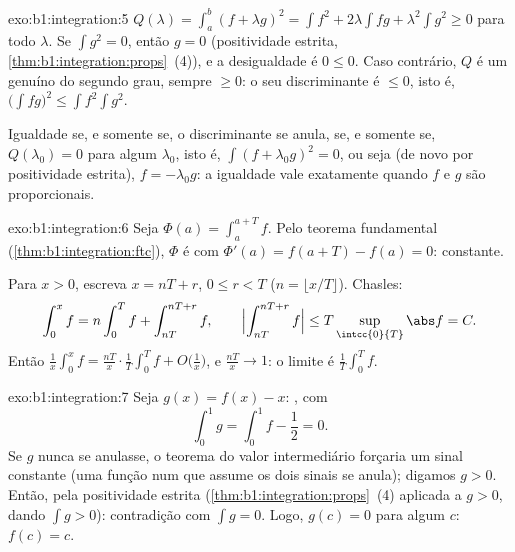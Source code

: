 \begin{solution}{exo:b1:integration:5}
$Q(\lambda) = \int_a^b (f + \lambda g)^2 = \int f^2 + 2\lambda \int
fg + \lambda^2 \int g^2 \geq 0$ para todo $\lambda$. Se $\int g^2 =
0$, então $g = 0$ (positividade estrita,
\cref{thm:b1:integration:props}~(4)), e a desigualdade é $0 \leq
0$. Caso contrário, $Q$ é um genuíno  do segundo grau,
sempre $\geq 0$: o seu discriminante é $\leq 0$, isto é, $\bigl(\int fg\bigr)^2 \leq \int
f^2 \int g^2$.

Igualdade se, e somente se, o discriminante se anula, se, e somente se,
$Q(\lambda_0) = 0$ para algum $\lambda_0$, isto é, $\int (f + \lambda_0 g)^2 = 0$, ou seja (de novo por positividade
estrita), $f = -\lambda_0 g$: a igualdade vale exatamente quando
$f$ e $g$ são proporcionais.
\end{solution}

\begin{solution}{exo:b1:integration:6}
Seja $\Phi(a) = \int_a^{a+T} f$. Pelo teorema fundamental
(\cref{thm:b1:integration:ftc}), $\Phi$ é  com
$\Phi'(a) = f(a + T) - f(a) = 0$: constante.

Para $x > 0$, escreva $x = nT + r$, $0 \leq r < T$ ($n = \lfloor x/T
\rfloor$). Chasles:
\[
\int_0^x f = n \int_0^T f + \int_{nT}^{nT + r} f,
\qquad
\Bigl| \int_{nT}^{nT+r} f \Bigr| \leq T \sup_{\intcc{0}{T}} \abs f
= C .
\]
Então $\frac 1x \int_0^x f = \frac{nT}{x}\cdot\frac 1T \int_0^T f +
O\bigl(\frac 1x\bigr)$, e $\frac{nT}{x} \to 1$: o limite é
$\frac1T \int_0^T f$.
\end{solution}

\begin{solution}{exo:b1:integration:7}
Seja $g(x) = f(x) - x$: , com
\[
\int_0^1 g = \int_0^1 f - \frac12 = 0 .
\]
Se $g$ nunca se anulasse, o teorema do valor intermediário forçaria um
sinal constante (uma função  num  que assume os dois
sinais se anula); digamos $g > 0$. Então, pela positividade estrita
(\cref{thm:b1:integration:props}~(4) aplicada a $g > 0$, dando
$\int g > 0$): contradição com $\int g = 0$. Logo, $g(c) = 0$ para
algum $c$: $f(c) = c$.
\end{solution}

